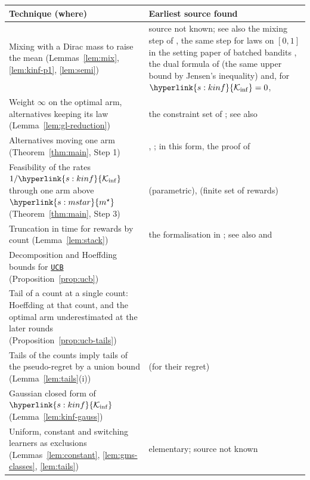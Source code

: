\documentclass[11pt]{article}
\newcommand{\sy}[2]{{\hyperlink{#1}{#2}}}
\newcommand{\Kinf}{\sy{s:kinf}{\mathcal{K}_{\inf}}}
\newcommand{\ms}{\sy{s:mstar}{m^{\star}}}
\newcommand{\ucb}{\hyperref[alg:ucb]{\texttt{UCB}}}
\begin{document}
\begin{center}
\small
\begin{tabular}{@{}p{}p{}@{}}
\toprule
Technique (where) & Earliest source found \\
\midrule
Mixing with a Dirac mass to raise the mean (Lemmas~\ref{lem:mix}, \ref{lem:kinf-p1}, \ref{lem:semi}) & source not known; see also the mixing step of \citet[Appendix~B.1]{GHMS22}, the same step for laws on $[0,1]$ in the setting paper of batched bandits \citep[Proposition~4.2]{INC-P006}, the dual formula of \citet[Theorem~8]{HT10} (the same upper bound by Jensen's inequality) and, for $\Kinf=0$, \citet[Exercise~16.4]{LS} \\
Weight $\infty$ on the optimal arm, alternatives keeping its law (Lemma~\ref{lem:gl-reduction}) & the constraint set of \citet[Theorem~1]{CMP17}; see also \citet{ATA89,GL97} \\
Alternatives moving one arm (Theorem~\ref{thm:main}, Step 1) & \citet{LR85}, \citet[proof of Theorem~1]{BK96}; in this form, the proof of \citet[Theorem~1]{GMS19} \\
Feasibility of the rates $1/\Kinf$ through one arm above $\ms$ (Theorem~\ref{thm:main}, Step 3) & \citet[Section~4]{CMP17} (parametric), \citet[Example~3]{VPG24} (finite set of rewards) \\
Truncation in time for rewards by count (Lemma~\ref{lem:stack}) & the formalisation in \citet{LML}; see also \citet{D36} and \citet[Section~4.6]{LS} \\
Decomposition and Hoeffding bounds for \ucb{} (Proposition~\ref{prop:ucb}) & \citet[Theorem~1]{ACF02} \\
Tail of a count at a single count: Hoeffding at that count, and the optimal arm underestimated at the later rounds (Proposition~\ref{prop:ucb-tails}) & \citet[Theorem~8 and its proof, with Theorem~2, (12)]{AMS09} \\
Tails of the counts imply tails of the pseudo-regret by a union bound (Lemma~\ref{lem:tails}(i)) & \citet[Proposition~2.1]{SA11} (for their regret) \\
Gaussian closed form of $\Kinf$ (Lemma~\ref{lem:kinf-gauss}) & \citet[Section~4.4]{BK96} \\
Uniform, constant and switching learners as exclusions (Lemmas~\ref{lem:constant}, \ref{lem:gms-classes}, \ref{lem:tails}) & elementary; source not known \\
\bottomrule
\end{tabular}
\end{center}
\end{document}
